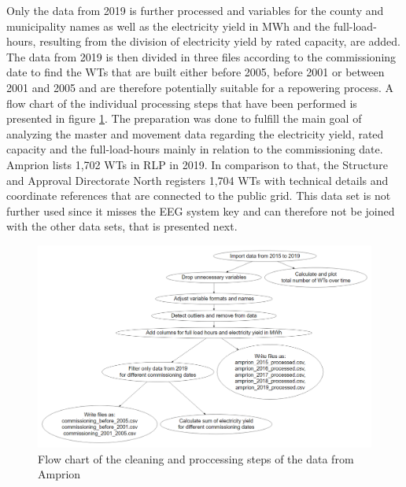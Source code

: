 \documentclass[a4paper,11pt]{article}
\begin{document}
Only the data from 2019 is further processed and variables for the county and municipality names as well as the electricity yield in MWh and the full-load-hours, resulting from the division of electricity yield by rated capacity, are added. The data from 2019 is then divided in three files according to the commissioning date to find the WTs that are built either before 2005, before 2001 or between 2001 and 2005 and are therefore potentially suitable for a repowering process. A flow chart of the individual processing steps that have been performed is presented in figure \ref{fig:preparation}. The preparation was done to fulfill the main goal of analyzing the master and movement data regarding the electricity yield, rated capacity and the full-load-hours mainly in relation to the commissioning date. Amprion lists 1,702 WTs in RLP in 2019. In comparison to that, the Structure and Approval Directorate North registers 1,704 WTs with technical details and coordinate references that are connected to the public grid. This data set is not further used since it misses the EEG system key and can therefore not be joined with the other data sets, that is presented next.
\begin{figure}

{\centering \includegraphics[width=1\linewidth]{data/Amprion/results_of_preparation/prepflow} 

}

\caption{Flow chart of the cleaning and proccessing steps of the data from Amprion}\label{fig:preparation}
\end{figure}
\end{document}
